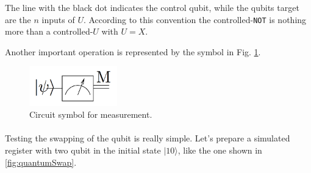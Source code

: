 \documentclass[a4paper,10pt]{article}
\begin{document}
The line with the black dot indicates the control qubit, while the qubits target are the $n$ inputs of $U$. According to this convention the controlled-\texttt{NOT} is nothing more than a controlled-$U$ with $U = X$.

Another important operation is represented by the symbol in Fig. \ref{mesured}.
\begin{figure}[!htb]
\begin{center}
\includegraphics[width=1.5in]{images/mesured.png}
\caption{Circuit symbol for measurement.}
\label{mesured}
\end{center}
\end{figure}

\paragraph{} Testing the swapping of the qubit is really simple. Let's prepare a simulated register with two qubit in the initial state $|10\rangle$, like the one shown in \autoref{fig:quantumSwap}.
\end{document}
